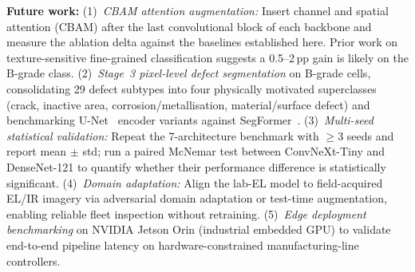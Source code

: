 \documentclass[conference]{IEEEtran}
\begin{document}
\textbf{Future work:}
(1)~\textit{CBAM attention augmentation:} Insert channel and spatial attention (CBAM) after the last convolutional block of each backbone and measure the ablation delta against the baselines established here. Prior work on texture-sensitive fine-grained classification suggests a 0.5--2\,pp gain is likely on the B-grade class.
(2)~\textit{Stage~3 pixel-level defect segmentation} on B-grade cells, consolidating 29 defect subtypes into four physically motivated superclasses (crack, inactive area, corrosion/metallisation, material/surface defect) and benchmarking U-Net~\cite{he2017} encoder variants against SegFormer~\cite{xie2021}.
(3)~\textit{Multi-seed statistical validation:} Repeat the 7-architecture benchmark with $\geq$3 seeds and report mean $\pm$ std; run a paired McNemar test between ConvNeXt-Tiny and DenseNet-121 to quantify whether their performance difference is statistically significant.
(4)~\textit{Domain adaptation:} Align the lab-EL model to field-acquired EL/IR imagery via adversarial domain adaptation or test-time augmentation, enabling reliable fleet inspection without retraining.
(5)~\textit{Edge deployment benchmarking} on NVIDIA Jetson Orin (industrial embedded GPU) to validate end-to-end pipeline latency on hardware-constrained manufacturing-line controllers.



\end{document}
